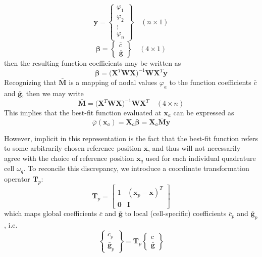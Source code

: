 \documentclass[11pt]{article} %
\begin{document}
\begin{equation}
	\mathbf{y} = \left\{ \begin{array}{c} \varphi_1 \\ \varphi_2 \\ \vdots \\ \varphi_n \end{array} \right\} \quad (n \times 1)
\end{equation}
\begin{equation}
	\mathbf{\beta} = \left\{ \begin{array}{c} \bar{c} \\ \bar{\mathbf{g}} \end{array} \right\} \quad (4 \times 1)
\end{equation}
then the resulting function coefficients may be written as
\begin{equation}
	\mathbf{\beta} = \big( \mathbf{X}^T \mathbf{W} \mathbf{X} \big)^{-1} \mathbf{W} \mathbf{X}^T \mathbf{y}
\end{equation}
Recognizing that $\bar{\mathbf{M}}$ is a mapping of nodal values $\varphi_a$ to the function coefficients $\bar{c}$ and $\bar{\mathbf{g}}$, then we may write
\begin{equation}
	\bar{\mathbf{M}} = \big( \mathbf{X}^T \mathbf{W} \mathbf{X} \big)^{-1} \mathbf{W} \mathbf{X}^T \quad (4 \times n)
\end{equation}
This implies that the best-fit function evaluated at $\mathbf{x}_a$ can be expressed as
\begin{equation}
	\bar{\varphi} (\mathbf{x}_a) = \mathbf{X}_a \mathbf{\beta} = \mathbf{X}_a \bar{\mathbf{M}} \mathbf{y}
\end{equation}

However, implicit in this representation is the fact that the best-fit function refers to some arbitrarily chosen reference position $\bar{\mathbf{x}}$, and thus will not necessarily agree with the choice of reference position $\mathbf{x}_q$ used for each individual quadrature cell $\omega_q$. To reconcile this discrepancy, we introduce a coordinate transformation operator $\mathbf{T}_p$:
\begin{equation}
	\mathbf{T}_p = \left[ \begin{array}{cc} 1 & (\mathbf{x}_p - \bar{\mathbf{x}})^T \\ \mathbf{0} & \mathbf{I} \end{array} \right] 
\end{equation}
which maps global coefficients $\bar{c}$ and $\bar{\mathbf{g}}$ to local (cell-specific) coefficients $\bar{c}_p$ and $\bar{\mathbf{g}}_p$, i.e.
\begin{equation}
	\left\{ \begin{array}{c} \bar{c}_p \\ \bar{\mathbf{g}}_p \end{array} \right\} = \mathbf{T}_p \left\{ \begin{array}{c} \bar{c} \\ \bar{\mathbf{g}} \end{array} \right\}
\end{equation}
\end{document}
